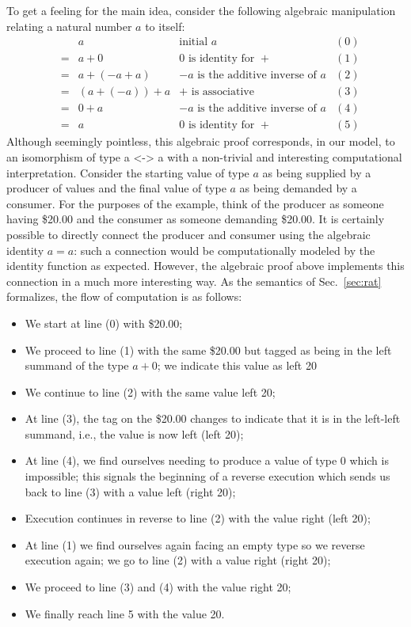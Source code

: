 \documentclass[preprint]{sigplanconf}
\begin{document}
To get a feeling for the main idea, consider the following algebraic
manipulation relating a natural number $a$ to itself:
\[\begin{array}{rclll}
&& a & \mbox{initial~$a$} & (0) \\
&=& a + 0 & \mbox{$0$~is~identity~for~$+$} & (1) \\
&=& a + (-a + a) & \mbox{$-a$~is~the~additive~inverse~of~$a$} & (2) \\
&=& (a + (-a)) + a & \mbox{$+$~is~associative} & (3) \\
&=& 0 + a & \mbox{$-a$~is~the~additive~inverse~of~$a$} & (4) \\
&=& a & \mbox{$0$~is~identity~for~$+$} & (5)
\end{array}\]
Although seemingly pointless, this algebraic proof corresponds, in our model,
to an isomorphism of type {{a <-> a}} with a non-trivial and interesting
computational interpretation. Consider the starting value of type $a$ as
being supplied by a producer of values and the final value of type $a$ as
being demanded by a consumer. For the purposes of the example, think of the
producer as someone having \$20.00 and the consumer as someone demanding
\$20.00. It is certainly possible to directly connect the producer and
consumer using the algebraic identity $a=a$: such a connection would be
computationally modeled by the identity function as expected. However, the
algebraic proof above implements this connection in a much more interesting
way. As the semantics of Sec.~\ref{sec:rat} formalizes, the flow of 
computation is as follows:
\begin{itemize}
\item We start at line (0) with \$20.00; 
\item We proceed to line (1) with the same \$20.00 but tagged as being in the
  left summand of the type $a+0$; we indicate this value as {{left 20}}
\item We continue to line (2) with the same value {{left 20}};
\item At line (3), the tag on the \$20.00 changes to indicate that it is
  in the left-left summand, i.e., the value is now {{left (left 20)}};
\item At line (4), we find ourselves needing to produce a value of type 0
  which is impossible; this signals the beginning of a reverse execution
  which sends us back to line (3) with a value {{left (right 20)}};
\item Execution continues in reverse to line (2) with the value 
  {{right (left 20)}};
\item At line (1) we find ourselves again facing an empty type so we reverse
  execution again; we go to line (2) with a value {{right (right 20)}};
\item We proceed to line (3) and (4) with the value {{right 20}};
\item We finally reach line 5 with the value {{20}}.
\end{itemize}
\end{document}
